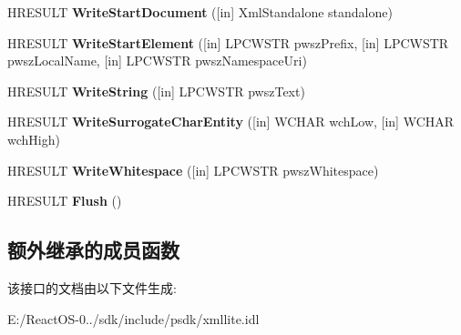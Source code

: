 \begin{DoxyCompactItemize}
H\+R\+E\+S\+U\+LT {\bfseries Write\+Start\+Document} (\mbox{[}in\mbox{]} Xml\+Standalone standalone)
\item 
\mbox{\label{interface_i_xml_writer_ad2c16bbd6fe0a6f98804f98a57301207}} 
H\+R\+E\+S\+U\+LT {\bfseries Write\+Start\+Element} (\mbox{[}in\mbox{]} L\+P\+C\+W\+S\+TR pwsz\+Prefix, \mbox{[}in\mbox{]} L\+P\+C\+W\+S\+TR pwsz\+Local\+Name, \mbox{[}in\mbox{]} L\+P\+C\+W\+S\+TR pwsz\+Namespace\+Uri)
\item 
\mbox{\label{interface_i_xml_writer_a9e1f82012f496079194ddb3301b851b0}} 
H\+R\+E\+S\+U\+LT {\bfseries Write\+String} (\mbox{[}in\mbox{]} L\+P\+C\+W\+S\+TR pwsz\+Text)
\item 
\mbox{\label{interface_i_xml_writer_a8c62514ff70307e67a4959c3d9907cd1}} 
H\+R\+E\+S\+U\+LT {\bfseries Write\+Surrogate\+Char\+Entity} (\mbox{[}in\mbox{]} W\+C\+H\+AR wch\+Low, \mbox{[}in\mbox{]} W\+C\+H\+AR wch\+High)
\item 
\mbox{\label{interface_i_xml_writer_a69efc3be64b5d34766529e08c7dad6ef}} 
H\+R\+E\+S\+U\+LT {\bfseries Write\+Whitespace} (\mbox{[}in\mbox{]} L\+P\+C\+W\+S\+TR pwsz\+Whitespace)
\item 
\mbox{\label{interface_i_xml_writer_a9d613069e0097e920937085ee17d2b18}} 
H\+R\+E\+S\+U\+LT {\bfseries Flush} ()
\end{DoxyCompactItemize}
\subsection*{额外继承的成员函数}


该接口的文档由以下文件生成\+:\begin{DoxyCompactItemize}
\item 
E\+:/\+React\+O\+S-\/0../sdk/include/psdk/xmllite.\+idl\end{DoxyCompactItemize}
